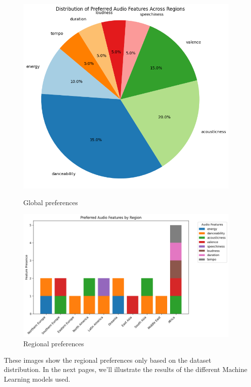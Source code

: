 \begin{figure}[H]
    \centering
    \begin{minipage}{0.45\textwidth}
        \centering
        \includegraphics[width=\textwidth]{media/features_preferences.png}  
        \caption{Global preferences}
    \end{minipage}
    \hfill
    \begin{minipage}{0.54\textwidth}
        \centering
        \includegraphics[width=\textwidth]{media/feature_preferences_regions.png}  
        \caption{Regional preferences}
    \end{minipage}
\end{figure}

These images show the regional preferences only based on the dataset distribution. In the next pages, we'll illustrate the results of the different Machine Learning models used.